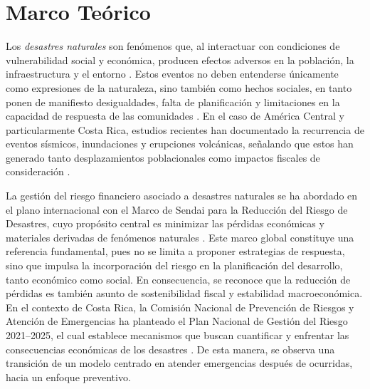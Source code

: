 \documentclass[12pt, a4paper]{article}
\begin{document}
\section*{Marco Teórico}


Los \textit{desastres naturales} son fenómenos que, al interactuar con condiciones de vulnerabilidad social y económica, producen efectos adversos en la población, la infraestructura y el entorno \cite{Paniagua1995}. Estos eventos no deben entenderse únicamente como expresiones de la naturaleza, sino también como hechos sociales, en tanto ponen de manifiesto desigualdades, falta de planificación y limitaciones en la capacidad de respuesta de las comunidades \cite{PerezMallaina2005}. En el caso de América Central y particularmente Costa Rica, estudios recientes han documentado la recurrencia de eventos sísmicos, inundaciones y erupciones volcánicas, señalando que estos han generado tanto desplazamientos poblacionales como impactos fiscales de consideración \cite{CentenoMorales2017,OrozcoMontoya2022}.

La gestión del riesgo financiero asociado a desastres naturales se ha abordado en el plano internacional con el Marco de Sendai para la Reducción del Riesgo de Desastres, cuyo propósito central es minimizar las pérdidas económicas y materiales derivadas de fenómenos naturales \cite{undrr2015}. Este marco global constituye una referencia fundamental, pues no se limita a proponer estrategias de respuesta, sino que impulsa la incorporación del riesgo en la planificación del desarrollo, tanto económico como social. En consecuencia, se reconoce que la reducción de pérdidas es también asunto de sostenibilidad fiscal y estabilidad macroeconómica. En el contexto de Costa Rica, la Comisión Nacional de Prevención de Riesgos y Atención de Emergencias ha planteado el Plan Nacional de Gestión del Riesgo 2021–2025, el cual establece mecanismos que buscan cuantificar y enfrentar las consecuencias económicas de los desastres \cite{cne2022}. De esta manera, se observa una transición de un modelo centrado en atender emergencias después de ocurridas, hacia un enfoque preventivo.
\end{document}
